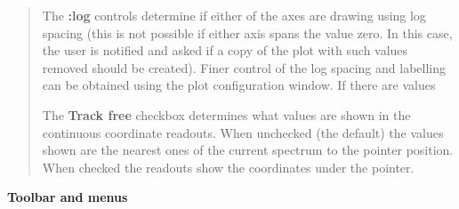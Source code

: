 \documentclass[twoside,11pt,nolof]{starlink}
\newcommand{\labelitem}[1]{\textbf{#1}}
\providecommand{\subheading}[1]{\textbf{\large{#1}}}
\begin{document}
\begin{quote}
 The \labelitem{:log} controls determine if either of the axes are drawing
 using log spacing (this is not possible if either axis spans the value
 zero. In this case, the user is notified and asked if a copy of the plot with such values
 removed should be created). Finer control of the log spacing and labelling can be obtained 
 using the plot configuration window. If there are values 

 The \labelitem{Track free} checkbox determines what values are shown in the
 continuous coordinate readouts. When unchecked (the default) the values
 shown are the nearest ones of the current spectrum to the pointer position.
 When checked the readouts show the coordinates under the pointer.

\end{quote}

\subheading{Toolbar and menus}
\end{document}

